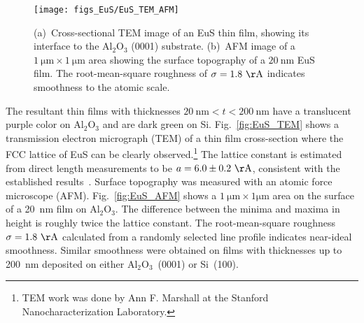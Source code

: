 %
\begin{figure}[ht]%
\subfloat{\label{fig:EuS_TEM}}%
\subfloat{\label{fig:EuS_AFM}}%
\centering%
\texttt{[image: figs\_EuS/EuS\_TEM\_AFM]}%
\caption[Micrographs of the cross-section and of the surface of an EuS thin film]{(a)~Cross-sectional TEM image of an EuS thin film, showing its interface to the Al$_2$O$_3$ (0001) substrate. (b)~AFM image of a $1~\mathrm{\mu{}m}\times{}1~\mathrm{\mu{}m}$ area showing the surface topography of a $20~\mathrm{nm}$ EuS film. The root-mean-square roughness of $\sigma=1.8~\mathrm\AA$ indicates smoothness to the atomic scale.}%
\label{fig:EuS_TEM_AFM}%
\end{figure}%
%
The resultant thin films with thicknesses $20~\mathrm{nm}<t<200~\mathrm{nm}$ have a translucent purple color on Al$_2$O$_3$ and are dark green on Si. Fig.~\ref{fig:EuS_TEM} shows a transmission electron micrograph (TEM) of a thin film cross-section where the FCC lattice of EuS can be clearly observed.\footnote{TEM work was done by Ann F. Marshall at the Stanford Nanocharacterization Laboratory.} The lattice constant is estimated from direct length measurements to be $a=6.0\pm0.2~\mathrm\AA$, consistent with the established results~\cite{EuS_Shafer}. Surface topography was measured with an atomic force microscope (AFM). Fig.~\ref{fig:EuS_AFM} shows a $1~\mathrm{\mu{}m}\times{}1\mathrm{\mu{}m}$ area on the surface of a 20~nm film on Al$_2$O$_3$. The difference between the minima and maxima in height is roughly twice the lattice constant. The root-mean-square roughness $\sigma=1.8~\mathrm\AA$ calculated from a randomly selected line profile indicates near-ideal smoothness. Similar smoothness were obtained on films with thicknesses up to 200~nm deposited on either Al$_2$O$_3$~(0001) or Si~(100).

